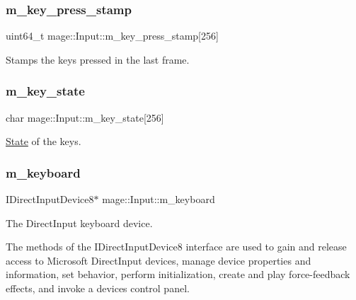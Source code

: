 \subsubsection{\texorpdfstring{m\+\_\+key\+\_\+press\+\_\+stamp}{m\_key\_press\_stamp}}
{\footnotesize\ttfamily uint64\+\_\+t mage\+::\+Input\+::m\+\_\+key\+\_\+press\+\_\+stamp\mbox{[}256\mbox{]}\hspace{0.3cm}{\ttfamily [private]}}

Stamps the keys pressed in the last frame. \hypertarget{classmage_1_1_input_aa0f92d1f06d3f952611ccdb69c9da1d4}{}\label{classmage_1_1_input_aa0f92d1f06d3f952611ccdb69c9da1d4} 
\subsubsection{\texorpdfstring{m\+\_\+key\+\_\+state}{m\_key\_state}}
{\footnotesize\ttfamily char mage\+::\+Input\+::m\+\_\+key\+\_\+state\mbox{[}256\mbox{]}\hspace{0.3cm}{\ttfamily [private]}}

\hyperlink{classmage_1_1_state}{State} of the keys. \hypertarget{classmage_1_1_input_a18ffc2becd62b77e9c4830e92cdf9999}{}\label{classmage_1_1_input_a18ffc2becd62b77e9c4830e92cdf9999} 
\subsubsection{\texorpdfstring{m\+\_\+keyboard}{m\_keyboard}}
{\footnotesize\ttfamily I\+Direct\+Input\+Device8$\ast$ mage\+::\+Input\+::m\+\_\+keyboard\hspace{0.3cm}{\ttfamily [private]}}

The Direct\+Input keyboard device.

The methods of the I\+Direct\+Input\+Device8 interface are used to gain and release access to Microsoft Direct\+Input devices, manage device properties and information, set behavior, perform initialization, create and play force-\/feedback effects, and invoke a device\textquotesingle{}s control panel. \hypertarget{classmage_1_1_input_ab62252cea073f7f0fae71ad4cb76a288}{}\label{classmage_1_1_input_ab62252cea073f7f0fae71ad4cb76a288} 
